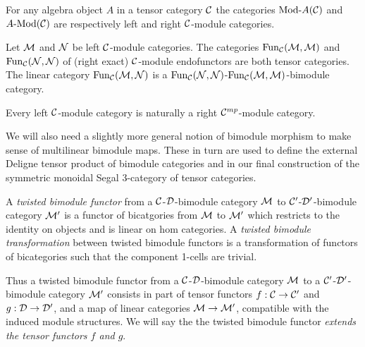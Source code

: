 \documentclass{amsart}
\begin{document}
\begin{example}
	For any algebra object $A$ in a tensor category $\mathcal C$ the categories $\Mod{}{A}(\cC)$ and $\Mod{A}{}(\cC)$ are respectively left and right $\mathcal C$-module categories. 
\end{example}

\begin{example}
	Let $\mathcal M$ and $\mathcal N$ be left $\mathcal C$-module categories. The categories $\operatorname{Fun}_{\mathcal C}(\mathcal M, \mathcal M)$ and $\operatorname{Fun}_{\mathcal C}(\mathcal N, \mathcal N)$ of (right exact) $\mathcal C$-module endofunctors are both tensor categories. The linear category $\operatorname{Fun}_{\mathcal C}(\mathcal M, \mathcal N)$ is a $\operatorname{Fun}_{\mathcal C}(\mathcal N, \mathcal N)$-$\operatorname{Fun}_{\mathcal C}(\mathcal M, \mathcal M)$-bimodule category.   
\end{example}

\begin{remark}
 	Every left $\mathcal C$-module category is naturally a right $\mathcal C^{mp}$-module category. 
\end{remark}

We will also need a slightly more general notion of bimodule morphism to make sense of multilinear bimodule maps. These in turn are used to define the external Deligne tensor product of bimodule categories and in our final construction of the symmetric monoidal Segal 3-category of tensor categories. 

\begin{definition}
	A {\em twisted bimodule functor} from a $\mathcal C$-$\mathcal D$-bimodule category $\mathcal M$  to $\mathcal C'$-$\mathcal D'$-bimodule category $\mathcal M'$ is a functor of bicatgories from $\mathcal M$ to $\mathcal M'$ which restricts to the identity on objects and is linear on hom categories. A {\em twisted bimodule transformation} between twisted bimodule functors is a transformation of functors of bicategories such that the component 1-cells are trivial.
\end{definition}

Thus a twisted bimodule functor from a $\mathcal C$-$\mathcal D$-bimodule category $\mathcal M$ to a $\mathcal C'$-$\mathcal D'$-bimodule category $\mathcal M'$ consists in part of tensor functors $f:\mathcal C \to \mathcal C'$ and $g:\mathcal D \to \mathcal D'$, and a map of linear categories $\mathcal M \to \mathcal M'$, compatible with the induced module structures. We will say the the twisted bimodule functor {\em extends the tensor functors $f$ and $g$}. 
\end{document}
